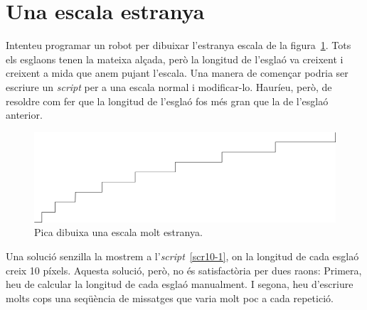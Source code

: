 \section{Una escala estranya}
Intenteu programar un robot per dibuixar l'estranya escala de la figura~\ref{fig1001}. Tots els esglaons tenen la mateixa alçada, però la  longitud de l'esglaó va creixent i creixent a mida que anem pujant l'escala. Una manera de començar podria ser escriure un \emph{script} per a una escala normal i modificar-lo. Hauríeu, però, de resoldre com fer que la longitud de l'esglaó fos més gran que la de l'esglaó anterior.
\begin{figure}[h]
\begin{center}
\includegraphics[scale=0.05]{Imatges/figura10-1.pdf}
\end{center}
\caption{Pica dibuixa una escala molt estranya.}
\label{fig1001}
\end{figure}

Una solució senzilla la mostrem a l'\emph{script}~\ref{scr10-1}, on la longitud de cada esglaó creix 10 píxels. Aquesta solució, però, no és satisfactòria per dues raons: Primera, heu de calcular la longitud de cada esglaó manualment. I segona, heu d'escriure molts cops una seqüència de missatges que varia molt poc a cada repetició.

